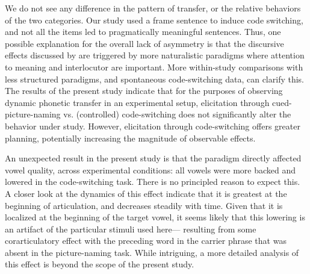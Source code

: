 \documentclass[12 pt]{article}
\begin{document}
We do not see any difference in the pattern of transfer, or the relative behaviors of the two categories. Our study used a frame sentence to induce code switching, and not all the items led to pragmatically meaningful sentences. Thus, one possible explanation for the overall lack of asymmetry is that the discursive effects discussed by \cite{olson2013bilingual} are triggered by more naturalistic paradigms where attention to meaning and interlocutor are important. More within-study comparisons with less structured paradigms, and spontaneous code-switching data, can clarify this. The results of the present study indicate that for the purposes of observing dynamic phonetic transfer in an experimental setup, elicitation through cued-picture-naming vs. (controlled) code-switching does not significantly alter the behavior under study. However, elicitation through code-switching offers greater planning, potentially increasing the magnitude of observable effects. 


An unexpected result in the present study is that the paradigm directly affected vowel quality, across experimental conditions: all vowels were more backed and lowered in the code-switching task. There is no principled reason to expect this. A closer look at the dynamics of this effect indicate that it is greatest at the beginning of articulation, and decreases steadily with time. Given that it is localized at the beginning of the target vowel, it seems likely that this lowering is an artifact of the particular stimuli used here--- resulting from some corarticulatory effect with the preceding word in the carrier phrase that was absent in the picture-naming task. While intriguing, a more detailed analysis of this effect is beyond the scope of the present study.  
\end{document}
